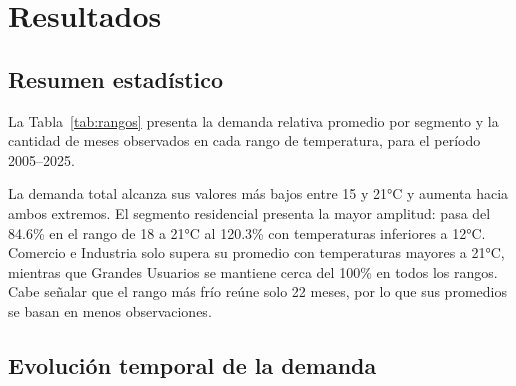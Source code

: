 \documentclass[10pt,a4paper]{article}
\begin{document}
\section{Resultados}

\subsection{Resumen estadístico}
La Tabla~\ref{tab:rangos} presenta la demanda relativa promedio por segmento y la cantidad de meses observados en cada rango de temperatura, para el período 2005--2025.

\begin{table}[H]
  \centering
  \caption{Demanda relativa promedio (\% del promedio anual) según rango de temperatura.}
  \label{tab:rangos}
\end{table}

La demanda total alcanza sus valores más bajos entre 15 y 21°C y aumenta hacia ambos extremos. El segmento residencial presenta la mayor amplitud: pasa del 84.6\% en el rango de 18 a 21°C al 120.3\% con temperaturas inferiores a 12°C. Comercio e Industria solo supera su promedio con temperaturas mayores a 21°C, mientras que Grandes Usuarios se mantiene cerca del 100\% en todos los rangos. Cabe señalar que el rango más frío reúne solo 22 meses, por lo que sus promedios se basan en menos observaciones.

\subsection{Evolución temporal de la demanda}
\end{document}
